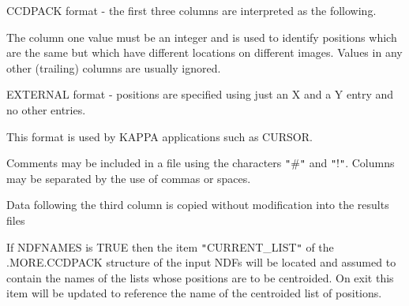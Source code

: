 {{        CCDPACK format - the first three columns are interpreted as the
        following.

        The column one value must be an integer and is used to identify
        positions which are the same but which have different locations
        on different images. Values in any other (trailing) columns are
        usually ignored.

        EXTERNAL format - positions are specified using just an X and
        a Y entry and no other entries.

        This format is used by KAPPA applications such as CURSOR.

        Comments may be included in a file using the characters {\tt "}\#{\tt "} and
        {\tt "}!{\tt "}. Columns may be separated by the use of commas or spaces.

         Data following the third column is copied without modification
           into the results files

       If NDFNAMES is TRUE then the item {\tt "}CURRENT\_LIST{\tt "} 
       of the 
       .MORE.CCDPACK structure of the input NDFs will be located 
       and assumed to contain the names of the lists whose positions 
       are to be centroided. On exit this item will be updated to 
       reference the name of the centroided list of positions.
   }
   }
